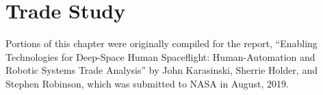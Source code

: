 \chapter{Trade Study}
\label{chapter:tradestudy}

Portions of this chapter were originally compiled for the report, ``Enabling Technologies for Deep-Space Human Spaceflight: Human-Automation and Robotic Systems Trade Analysis'' by John Karasinski, Sherrie Holder, and Stephen Robinson, which was submitted to NASA in August, 2019.







